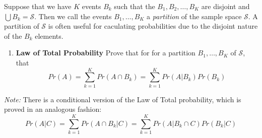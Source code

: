 \documentclass[]{book}
\providecommand{\tightlist}{%
  \setlength{\itemsep}{0pt}\setlength{\parskip}{0pt}}
\begin{document}
Suppose that we have \(K\) events \(B_k\) such that the
\(B_1, B_2, \dots, B_K\) are disjoint and \(\bigcup B_k=\mathcal{S}\).
Then we call the events \(B_1,\dots,B_K\) a \emph{partition} of the
sample space \(\mathcal{S}\). A partition of \(\mathcal{S}\) is often
useful for caculating probabilities due to the disjoint nature of the
\(B_k\) elements.

\begin{enumerate}
\def\labelenumi{\arabic{enumi}.}
\setcounter{enumi}{7}
\tightlist
\item
  \textbf{Law of Total Probability} Prove that for for a partition
  \(B_1, \dots, B_K\) of \(\mathcal{S}\), that
  \[Pr(A) = \sum_{k=1}^K Pr(A \cap B_k) = \sum_{k=1}^K Pr(A \Big\rvert B_k) Pr( B_k )\]
\end{enumerate}

\emph{Note:} There is a conditional version of the Law of Total
probability, which is proved in an analogous fashion:
\[Pr(A|C) = \sum_{k=1}^K Pr(A \cap B_k \big\rvert C) = \sum_{k=1}^K Pr(A \big\rvert B_k \cap C) Pr( B_k \big\rvert C)\]
\end{document}
